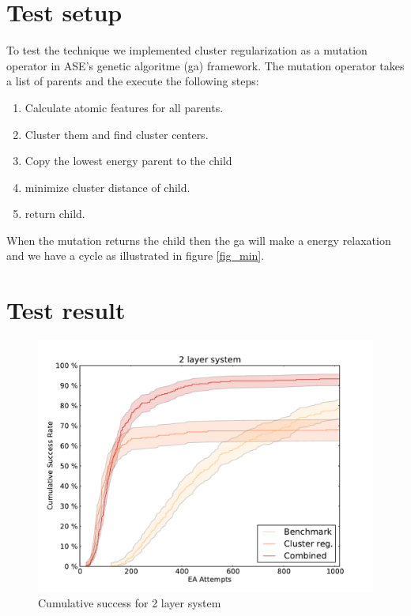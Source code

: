 \documentclass[%
 aps,
 prl,%
 amsmath,amssymb,
 reprint,%
]{revtex4-1}
\begin{document}
\section{Test setup}

To test the technique we implemented cluster regularization as a mutation operator in ASE's genetic algoritme (ga)\cite{ase_ga} framework. 
The mutation operator takes a list of parents and the execute the following steps:
\begin{enumerate}
\item Calculate atomic features for all parents.
\item Cluster them and find cluster centers.
\item Copy the lowest energy parent to the child
\item minimize cluster distance of child.
\item return child.
\end{enumerate}
When the mutation returns the child then the ga will make a energy relaxation 
and we have a cycle as illustrated in figure \ref{fig_min}.


\section{Test result}


\begin{figure}[h]
    \centering
    \includegraphics[width=1.0\columnwidth]{2lsuccess.pdf}
    \caption{Cumulative success for 2 layer system}
    \label{fig:fig4}
\end{figure}
\end{document}
